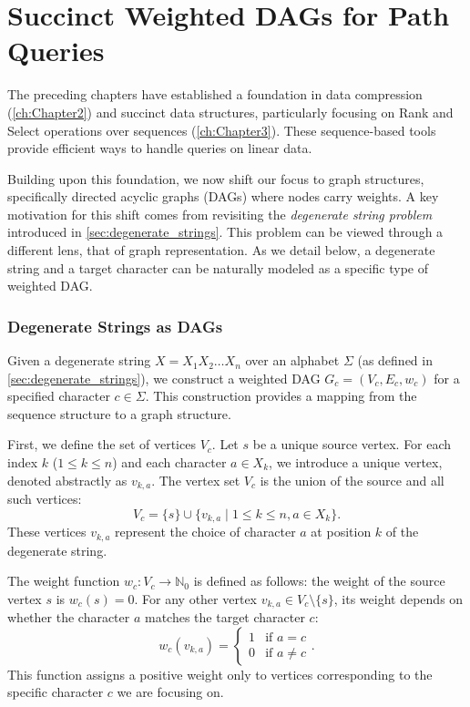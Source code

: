 \chapter{Succinct Weighted DAGs for Path Queries}
\label{chap:succinct_dags}

The preceding chapters have established a foundation in data compression (\autoref{ch:Chapter2}) and succinct data structures, particularly focusing on Rank and Select operations over sequences (\autoref{ch:Chapter3}). These sequence-based tools provide efficient ways to handle queries on linear data.

Building upon this foundation, we now shift our focus to graph structures, specifically directed acyclic graphs (DAGs) where nodes carry weights. A key motivation for this shift comes from revisiting the \emph{degenerate string problem} introduced in \autoref{sec:degenerate_strings}. This problem can be viewed through a different lens, that of graph representation. As we detail below, a degenerate string and a target character can be naturally modeled as a specific type of weighted DAG.

\subsection*{Degenerate Strings as DAGs}
\label{subsec:dag_from_degenerate}

Given a degenerate string $X = X_1 X_2 \dots X_n$ over an alphabet $\Sigma$ (as defined in \autoref{sec:degenerate_strings}), we construct a weighted DAG $G_c = (V_c, E_c, w_c)$ for a specified character $c \in \Sigma$. This construction provides a mapping from the sequence structure to a graph structure.

First, we define the set of vertices $V_c$. Let $s$ be a unique source vertex. For each index $k$ ($1 \le k \le n$) and each character $a \in X_k$, we introduce a unique vertex, denoted abstractly as $v_{k,a}$. The vertex set $V_c$ is the union of the source and all such vertices:
\[ V_c = \{s\} \cup \{ v_{k,a} \mid 1 \le k \le n, a \in X_k \}. \]
These vertices $v_{k,a}$ represent the choice of character $a$ at position $k$ of the degenerate string.

The weight function $w_c: V_c \to \mathbb{N}_0$ is defined as follows: the weight of the source vertex $s$ is $w_c(s) = 0$. For any other vertex $v_{k,a} \in V_c \setminus \{s\}$, its weight depends on whether the character $a$ matches the target character $c$:
\[ w_c(v_{k,a}) = \begin{cases} 1 & \text{if } a = c \\ 0 & \text{if } a \neq c \end{cases}. \]
This function assigns a positive weight only to vertices corresponding to the specific character $c$ we are focusing on.

